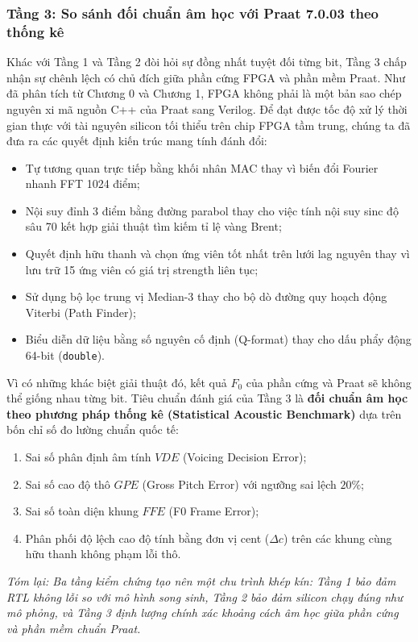 \subsubsection*{Tầng 3: So sánh đối chuẩn âm học với Praat 7.0.03 theo thống kê}
Khác với Tầng 1 và Tầng 2 đòi hỏi sự đồng nhất tuyệt đối từng bit, Tầng 3 chấp nhận sự chênh lệch có chủ đích giữa phần cứng FPGA và phần mềm Praat. Như đã phân tích từ Chương 0 và Chương 1, FPGA không phải là một bản sao chép nguyên xi mã nguồn C++ của Praat sang Verilog. Để đạt được tốc độ xử lý thời gian thực với tài nguyên silicon tối thiểu trên chip FPGA tầm trung, chúng ta đã đưa ra các quyết định kiến trúc mang tính đánh đổi:
\begin{itemize}
    \item Tự tương quan trực tiếp bằng khối nhân MAC thay vì biến đổi Fourier nhanh FFT 1024 điểm;
    \item Nội suy đỉnh 3 điểm bằng đường parabol thay cho việc tính nội suy sinc độ sâu 70 kết hợp giải thuật tìm kiếm tỉ lệ vàng Brent;
    \item Quyết định hữu thanh và chọn ứng viên tốt nhất trên lưới lag nguyên thay vì lưu trữ 15 ứng viên có giá trị strength liên tục;
    \item Sử dụng bộ lọc trung vị Median-3 thay cho bộ dò đường quy hoạch động Viterbi (Path Finder);
    \item Biểu diễn dữ liệu bằng số nguyên cố định (Q-format) thay cho dấu phẩy động 64-bit (\texttt{double}).
\end{itemize}

Vì có những khác biệt giải thuật đó, kết quả $F_0$ của phần cứng và Praat sẽ không thể giống nhau từng bit. Tiêu chuẩn đánh giá của Tầng 3 là \textbf{đối chuẩn âm học theo phương pháp thống kê (Statistical Acoustic Benchmark)} dựa trên bốn chỉ số đo lường chuẩn quốc tế:
\begin{enumerate}
    \item Sai số phân định âm tính $VDE$ (Voicing Decision Error);
    \item Sai số cao độ thô $GPE$ (Gross Pitch Error) với ngưỡng sai lệch $20\%$;
    \item Sai số toàn diện khung $FFE$ (F0 Frame Error);
    \item Phân phối độ lệch cao độ tính bằng đơn vị cent ($\Delta c$) trên các khung cùng hữu thanh không phạm lỗi thô.
\end{enumerate}

\textit{Tóm lại: Ba tầng kiểm chứng tạo nên một chu trình khép kín: Tầng 1 bảo đảm RTL không lỗi so với mô hình song sinh, Tầng 2 bảo đảm silicon chạy đúng như mô phỏng, và Tầng 3 định lượng chính xác khoảng cách âm học giữa phần cứng và phần mềm chuẩn Praat.}

